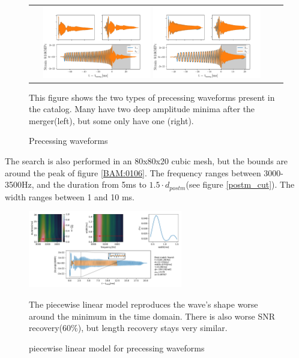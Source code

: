 \begin{figure}[hbt!]
\begin{center}
\begin{tabular}{cc}
\includegraphics[width=0.45\textwidth, angle=0]{images/Data_analysis/results/d_postm_chi.pdf}

\includegraphics[width=0.45\textwidth, angle=0]{images/Data_analysis/results/d_postm_chi1.pdf}
\end{tabular}
\end{center}
\caption{Precessing waveforms}
This figure shows the two types of precessing waveforms present in the catalog. Many have two deep amplitude minima after the merger(left), but some only have one (right).
\end{figure}

\FloatBarrier





The search is also performed in an 80x80x20 cubic mesh, but the bounds are around the peak of figure \ref{BAM:0106}. The frequency ranges between 3000-3500Hz, and the duration from 5ms to $1.5\cdot d_{postm}$(see figure \ref{postm_cut}). The width ranges between 1 and 10 ms.

\begin{figure}[hbt!]
\begin{center}
\includegraphics[width=0.6\textwidth, angle=0]{images/Data_analysis/results/envel_110_lin.pdf}
\caption{piecewise linear model for precessing waveforms}
\end{center}
The piecewise linear model reproduces the wave's shape worse around the minimum in the time domain. There is also worse SNR recovery(60\%), but length recovery stays very similar.
\end{figure}

